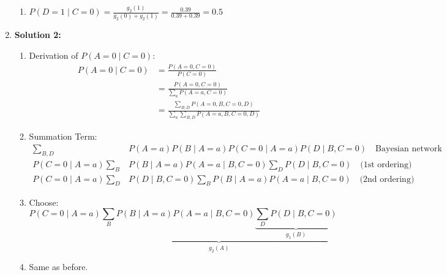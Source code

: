 \begin{example}
\begin{enumerate}
\begin{enumerate}
            \item \( P(D=1 \mid C=0) = \frac{g_2(1)}{g_2(0) + g_2(1)} = \frac{0.39}{0.39 + 0.39} = 0.5 \)
        \end{enumerate}   
        \item \textbf{Solution 2:}
        \begin{enumerate}
            \item Derivation of \( P(A=0 \mid C=0) \):
            \begin{align*}
                P(A=0 \mid C=0) &= \frac{P(A=0,C=0)}{P(C=0)} \\
                &= \frac{P(A=0,C=0)}{\sum_a P(A=a,C=0)} \\
                &= \frac{\sum_{B,D} P(A=0,B,C=0,D)}{\sum_a \sum_{B,D} P(A=a,B,C=0,D)}
            \end{align*}
            \item Summation Term:
            \begin{align*}
                \sum_{B,D} & P(A=a) P(B \mid A=a) P(C=0 \mid A=a) P(D \mid B,C=0) \quad \text{Bayesian network} \\
                P(C=0 \mid A=a) \sum_B & P(B \mid A=a) P(A=a \mid B,C=0) \sum_D P(D \mid B,C=0) \quad \text{(1st ordering)} \\
                P(C=0 \mid A=a) \sum_D & P(D \mid B,C=0) \sum_B P(B \mid A=a) P(A=a \mid B,C=0) \quad \text{(2nd ordering)}
            \end{align*}
            \item Choose:
            \[
            P(C=0 \mid A=a) \underbrace{\sum_B P(B \mid A=a) P(A=a \mid B,C=0) \underbrace{\sum_D P(D \mid B,C=0)}_{g_1(B)}}_{g_2(A)}
            \]
            \item Same as before.
        \end{enumerate}     
    \end{enumerate}
\end{example}
\newpage

